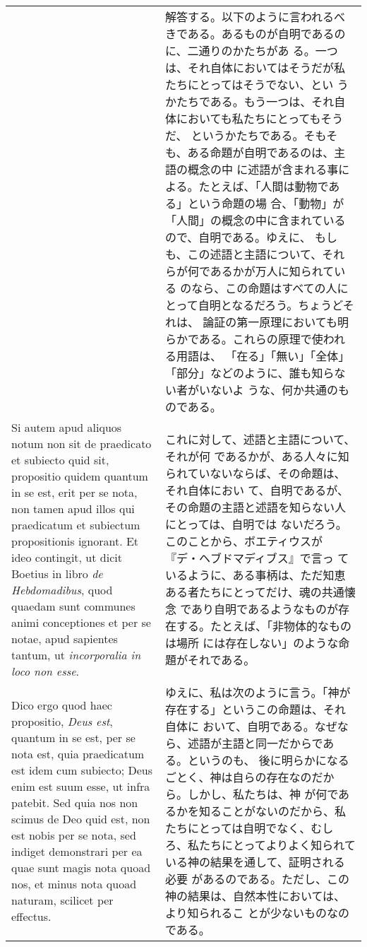 \documentclass[10pt]{jsarticle} %
\begin{document}
\begin{longtable}{p{21em}p{21em}}
&

解答する。以下のように言われるべきである。あるものが自明であるのに、二通りのかたちがあ
 る。一つは、それ自体においてはそうだが私たちにとってはそうでない、とい
 うかたちである。もう一つは、それ自体においても私たちにとってもそうだ、
 というかたちである。そもそも、ある命題が自明であるのは、主語の概念の中
 に述語が含まれる事による。たとえば、「人間は動物である」という命題の場
 合、「動物」が「人間」の概念の中に含まれているので、自明である。ゆえに、
 もしも、この述語と主語について、それらが何であるかが万人に知られている
 のなら、この命題はすべての人にとって自明となるだろう。ちょうどそれは、
 論証の第一原理においても明らかである。これらの原理で使われる用語は、
 「在る」「無い」「全体」「部分」などのように、誰も知らない者がいないよ
 うな、何か共通のものである。

\\

Si autem apud aliquos notum non sit de
praedicato et subiecto quid sit, propositio quidem quantum in se est,
erit per se nota, non tamen apud illos qui praedicatum et subiectum
propositionis ignorant. Et ideo contingit, ut dicit Boetius in libro
 {\it de Hebdomadibus}, quod quaedam sunt communes animi conceptiones et per se
notae, apud sapientes tantum, ut {\it incorporalia in loco non esse}. 


&

これに対して、述語と主語について、それが何
 であるかが、ある人々に知られていないならば、その命題は、それ自体におい
 て、自明であるが、その命題の主語と述語を知らない人にとっては、自明では
 ないだろう。このことから、ボエティウスが『デ・ヘブドマディブス』で言っ
 ているように、ある事柄は、ただ知恵ある者たちにとってだけ、魂の共通懐念
 であり自明であるようなものが存在する。たとえば、「非物体的なものは場所
 には存在しない」のような命題がそれである。

\\


Dico
ergo quod haec propositio, {\it Deus est}, quantum in se est, per se nota est,
quia praedicatum est idem cum subiecto; Deus enim est suum esse, ut
infra patebit. Sed quia nos non scimus de Deo quid est, non est nobis
per se nota, sed indiget demonstrari per ea quae sunt magis nota quoad
nos, et minus nota quoad naturam, scilicet per effectus.


&
ゆえに、私は次のように言う。「神が存在する」というこの命題は、それ自体に
 おいて、自明である。なぜなら、述語が主語と同一だからである。というのも、
 後に明らかになるごとく、神は自らの存在なのだから。しかし、私たちは、神
 が何であるかを知ることがないのだから、私たちにとっては自明でなく、むし
 ろ、私たちにとってよりよく知られている神の結果を通して、証明される必要
 があるのである。ただし、この神の結果は、自然本性においては、より知られるこ
 とが少ないものなのである。



\end{longtable}
\end{document}
